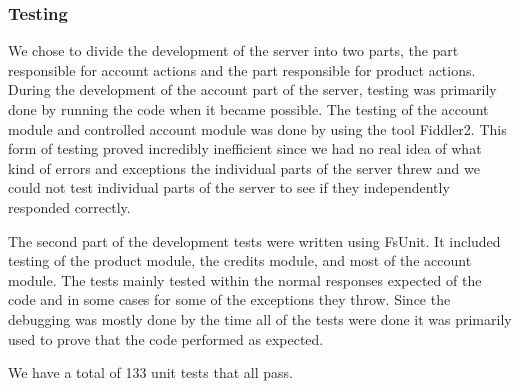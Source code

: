 \subsubsection{Testing}
We chose to divide the development of the server into two parts, the part responsible for account actions and the part responsible for product actions. During the development of the account part of the server, testing was primarily done by running the code when it became possible. The testing of the account module and controlled account module was done by using the tool Fiddler2. This form of testing proved incredibly inefficient since we had no real idea of what kind of errors and exceptions the individual parts of the server threw and we could not test individual parts of the server to see if they independently responded correctly.

The second part of the development tests were written using FsUnit. It included testing of the product module, the credits module, and most of the account module. The tests mainly tested within the normal responses expected of the code and in some cases for some of the exceptions they throw.  Since the debugging was mostly done by the time all of the tests were done it was primarily used to prove that the code performed as expected.

We have a total of 133 unit tests that all pass.